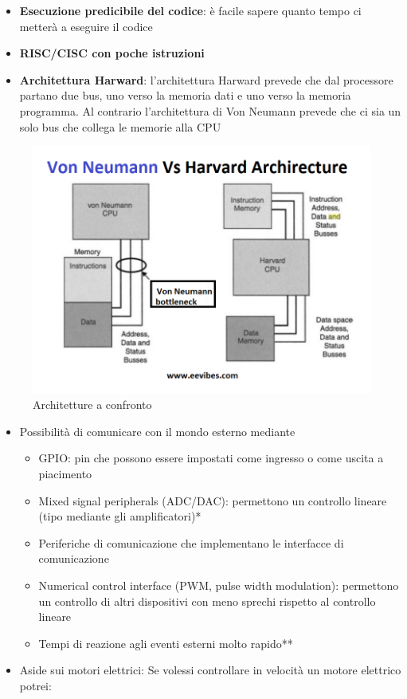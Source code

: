 \documentclass[
]{book}
\providecommand{\tightlist}{%
  \setlength{\itemsep}{0pt}\setlength{\parskip}{0pt}}
\begin{document}
\begin{itemize}
\tightlist
\item
  \textbf{Esecuzione predicibile del codice}: è facile sapere quanto
  tempo ci metterà a eseguire il codice
\item
  \textbf{RISC/CISC con poche istruzioni}
\item
  \textbf{Architettura Harward}: l'architettura Harward prevede che dal
  processore partano due bus, uno verso la memoria dati e uno verso la
  memoria programma. Al contrario l'architettura di Von Neumann prevede
  che ci sia un solo bus che collega le memorie alla CPU
\end{itemize}

\begin{figure}
\centering
\includegraphics[width=0.4\linewidth,height=\textheight,keepaspectratio]{immagini/48.png}
\caption{Architetture a confronto}
\end{figure}

\begin{itemize}
\tightlist
\item
  Possibilità di comunicare con il mondo esterno mediante

  \begin{itemize}
  \tightlist
  \item
    GPIO: pin che possono essere impostati come ingresso o come uscita a
    piacimento
  \item
    Mixed signal peripherals (ADC/DAC): permettono un controllo lineare
    (tipo mediante gli amplificatori)*
  \item
    Periferiche di comunicazione che implementano le interfacce di
    comunicazione
  \item
    Numerical control interface (PWM, pulse width modulation):
    permettono un controllo di altri dispositivi con meno sprechi
    rispetto al controllo lineare
  \item
    Tempi di reazione agli eventi esterni molto rapido**
  \end{itemize}
\item
  Aside sui motori elettrici: Se volessi controllare in velocità un
  motore elettrico potrei:
\end{itemize}
\end{document}
